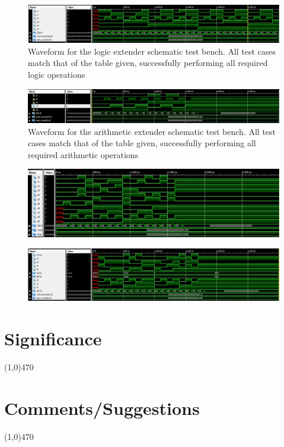 \documentclass[12pt]{article}
\begin{document}

\begin{figure}[h]
    \centering
	\includegraphics[scale=.33]{logic_ext_tb_wave}
	\caption{Waveform for the logic extender schematic test bench. All test cases match that of the table given, successfully performing all required logic operations}
\end{figure}

\begin{figure}[h]
    \centering
	\includegraphics[scale=.33]{arith_ext_tb_wave.png}
	\caption{Waveform for the arithmetic extender schematic test bench. All test cases match that of the table given, successfully performing all required arithmetic operations}
\end{figure}

\begin{figure}[h]
    \centering
	\includegraphics[scale=.2]{seven_segment_tb_wave.png}
\end{figure}

\begin{figure}[h]
    \centering
	\includegraphics[scale=.33]{alu4bit_tb_wave.png}
\end{figure}

	\newpage		
\section{Significance} \vspace{-.7cm} \line(1,0){470}
	\paragraph{}
		

 \section{Comments/Suggestions}\vspace{-.7cm} \line(1,0){470}
 	\paragraph{}

		
\end{document}
